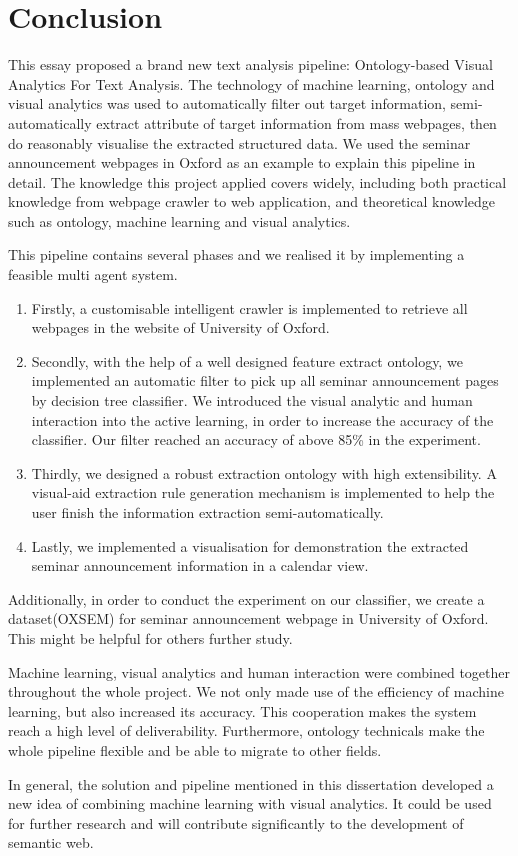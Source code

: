\section{Conclusion}
This essay proposed a brand new text analysis pipeline: Ontology-based Visual Analytics For Text Analysis. The technology of machine learning, ontology and visual analytics was used to automatically filter out target information, semi-automatically extract attribute of target information from mass webpages, then do reasonably visualise the extracted structured data. We used the seminar announcement webpages in Oxford as an example to explain this pipeline in detail. The knowledge this project applied covers widely, including both practical knowledge from webpage crawler to web application, and theoretical knowledge such as ontology, machine learning and visual analytics.

This pipeline contains several phases and we realised it by implementing a feasible multi agent system.
\begin{enumerate}
	\item Firstly, a customisable intelligent crawler is implemented to retrieve all webpages in the website of University of Oxford.
	\item Secondly, with the help of a well designed feature extract ontology, we implemented an automatic filter to pick up all seminar announcement pages by decision tree classifier. We introduced the visual analytic and human interaction into the active learning, in order to increase the accuracy of the classifier. Our filter reached an accuracy of above 85\% in the experiment.
	\item Thirdly, we designed a robust extraction ontology with high extensibility. A visual-aid extraction rule generation mechanism is implemented to help the user finish the information extraction semi-automatically. 
	\item Lastly, we implemented a visualisation for demonstration the extracted seminar announcement information in a calendar view.
\end{enumerate}
Additionally, in order to conduct the experiment on our classifier, we create a dataset(OXSEM) for seminar announcement webpage in University of Oxford. This might be helpful for others further study.

Machine learning, visual analytics and human interaction were combined together throughout the whole project. We not only made use of the efficiency of machine learning, but also increased its accuracy. This cooperation makes the system reach a high level of deliverability. Furthermore, ontology technicals make the whole pipeline flexible and be able to migrate to other fields.

In general, the solution and pipeline mentioned in this dissertation developed a new idea of combining machine learning with visual analytics. It could be used for further research and will contribute significantly to the development of semantic web.


